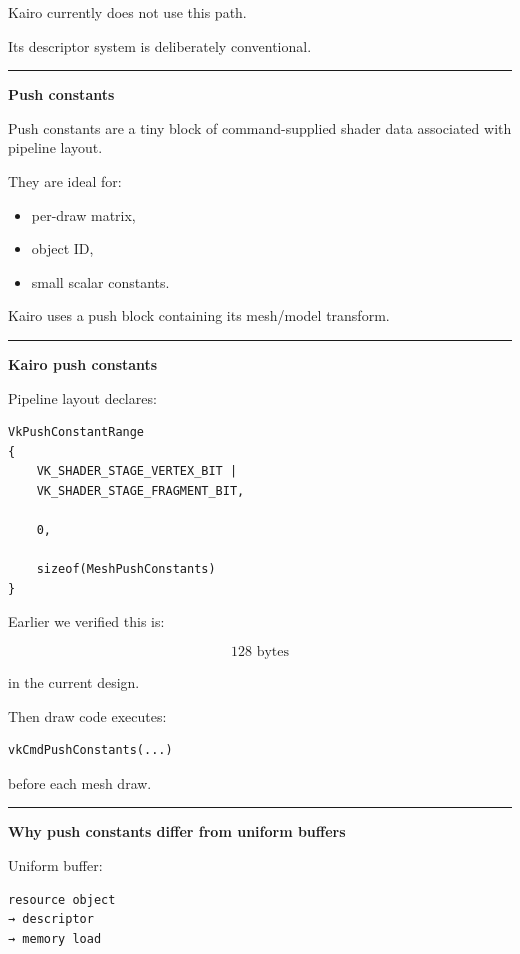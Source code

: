 Kairo currently does not use this path.

Its descriptor system is deliberately conventional.

\begin{center}\rule{0.5\linewidth}{0.5pt}\end{center}

\textbf{Push constants}

Push constants are a tiny block of command-supplied shader data associated with pipeline layout.

They are ideal for:

\begin{itemize}
\tightlist
\item
  per-draw matrix,
\item
  object ID,
\item
  small scalar constants.
\end{itemize}

Kairo uses a push block containing its mesh/model transform.

\begin{center}\rule{0.5\linewidth}{0.5pt}\end{center}

\textbf{Kairo push constants}

Pipeline layout declares:

\begin{verbatim}
VkPushConstantRange
{
    VK_SHADER_STAGE_VERTEX_BIT |
    VK_SHADER_STAGE_FRAGMENT_BIT,

    0,

    sizeof(MeshPushConstants)
}
\end{verbatim}

Earlier we verified this is:

\[
128\text{ bytes}
\]

in the current design.

Then draw code executes:

\begin{verbatim}
vkCmdPushConstants(...)
\end{verbatim}

before each mesh draw.

\begin{center}\rule{0.5\linewidth}{0.5pt}\end{center}

\textbf{Why push constants differ from uniform buffers}

Uniform buffer:

\begin{verbatim}
resource object
→ descriptor
→ memory load
\end{verbatim}

